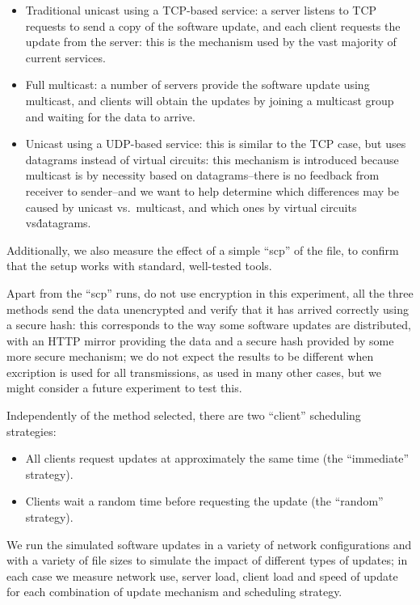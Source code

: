 \documentclass[a4paper,12pt]{article}
\begin{document}
\begin{itemize}
\item Traditional unicast using a TCP-based service: a
server listens to TCP requests to send a copy of the software
update, and each client requests
the update from the server: this is the mechanism used by the vast
majority of current services.
\item Full multicast: a number of servers provide the software
update using multicast, and clients will obtain the updates by
joining a multicast group and waiting for the data to arrive.
\item Unicast using a UDP-based service: this is similar to the
TCP case, but uses datagrams instead of virtual circuits: this
mechanism is introduced because multicast is by necessity based
on datagrams--there is no feedback from receiver to sender--and
we want to help determine which differences may be caused by
unicast vs.\ multicast, and which ones by virtual circuits vs\.
datagrams.
\end{itemize}

Additionally, we also measure the effect of a simple ``scp''
of the file, to confirm that the setup works with standard,
well-tested tools.

Apart from the ``scp'' runs, do not use encryption in this experiment,
all the three methods send the data unencrypted and verify that it
has arrived correctly using a secure hash: this corresponds to the way
some software updates are distributed, with an HTTP mirror providing
the data and a secure hash provided by some more secure mechanism; we
do not expect the results to be different when excription is used for
all transmissions, as used in many other cases, but we might consider
a future experiment to test this.

Independently of the method selected, there are two ``client''
scheduling strategies:

\begin{itemize}
\item All clients request updates at approximately the same time
(the ``immediate'' strategy).
\item Clients wait a random time before requesting the update
(the ``random'' strategy).
\end{itemize}

We run the simulated software updates in a variety of network
configurations and with a variety of file sizes to simulate the
impact of different types of updates; in each case we measure network
use, server load, client load and speed of update for each combination
of update mechanism and scheduling strategy.
\end{document}
